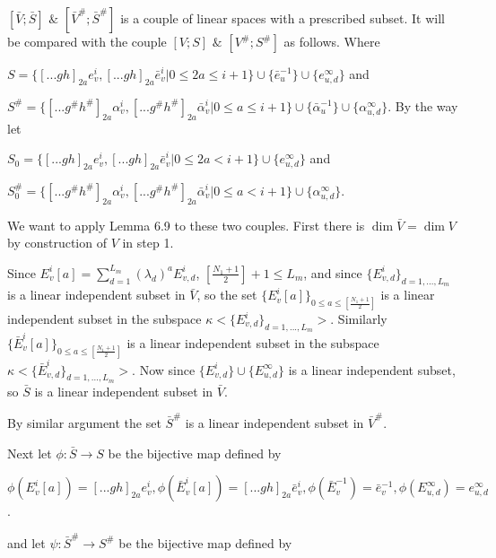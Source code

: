 \def\CTEXPreproc{Created by ctex v0.2.12, don't edit!}\documentclass[11pt]{article}
\begin{document}
\begin{pf}
        $[ \bar{V};  \bar{S}  ]$ $\&$  $[ \bar{V}^{\#};  \bar{S}^{\#}  ]$ is a couple of linear spaces with a prescribed subset. It will be
       compared with the couple   $[ V;  S  ]$ $\&$ $[ V^{\#}; S^{\#}  ]$ as follows. Where


        $S=\{[...gh]_{2a} e^{i}_{v}, [...gh]_{2a}\bar{e}^{i}_{v}| 0\leq 2a \leq i+1 \} \cup \{ \bar{e}^{-1}_u \}  \cup \{ e^{\infty}_{u,d} \}   $ and

       $S^{\#}= \{[...g^{\#}h^{\#}]_{2a} \alpha^{i}_{v}, [...g^{\#}h^{\#}]_{2a}\bar{\alpha}^{i}_{v}| 0\leq a \leq i+1 \} \cup \{ \bar{\alpha}^{-1}_u \}  \cup \{ \alpha^{\infty}_{u,d} \}  $. By the way let

       $S_0=\{[...gh]_{2a} e^{i}_{v}, [...gh]_{2a}\bar{e}^{i}_{v}| 0\leq 2a < i+1 \}   \cup \{ e^{\infty}_{u,d} \}   $ and

       $S^{\#}_0= \{[...g^{\#}h^{\#}]_{2a} \alpha^{i}_{v}, [...g^{\#}h^{\#}]_{2a}\bar{\alpha}^{i}_{v}| 0\leq a < i+1 \}  \cup \{ \alpha^{\infty}_{u,d} \}  $.



        We want to apply Lemma 6.9 to these  two couples. First there is $\dim \bar{V} =\dim V$ by construction of $V$ in step 1.

      Since $E^i _v [a]= \sum^{L_m }_{d=1} (\lambda_d )^a E^i _{v,d} $, $[\frac{N_1 +1}{2}]+1 \leq L_m$, and since $\{ E^i _{v,d}  \}_{d=1,...,L_m}$ is a linear independent subset in $\bar{V}$, so the set $\{  E^i _{v}[a]   \}_{0\leq a\leq [\frac{N_1 +1}{2}]   } $ is a linear independent subset in the subspace $\kappa<\{   E^i _{v,d}  \}_{d=1,...,L_m}>$. Similarly  $\{  \bar{E}^i _{v}[a]   \}_{0\leq a\leq [\frac{N_1 +1}{2}]   } $ is a linear independent subset in the subspace  $\kappa<\{   \bar{E}^i _{v,d}  \}_{d=1,...,L_m}>$. Now since
      $\{   E^i _{v,d}   \} \cup \{  E^{\infty}_{u,d} \} $ is a linear independent subset, so $\bar{S}$ is a linear independent subset in $\bar{V}$.

      By similar argument the set $\bar{S}^{\#}$ is a linear independent subset in $\bar{V}^{\#}$.

      Next let $\phi: \bar{S} \rightarrow
        S $ be the bijective map defined by

        $\phi( E^i _{v}[a] )=[...gh]_{2a}e^i _v , \phi(\bar{E}^i _{v}[a])=[...gh]_{2a}\bar{e}^i _v , \phi (\bar{E}^{-1}_v )= \bar{e}^{-1}_v ,
      \phi ( E^{\infty}_{u,d}  )= e^{\infty}_{u,d} $.

      and let $\psi: \bar{S}^{\#} \rightarrow
       S^{\#}$ be the bijective map defined by


\end{pf}
\end{document}
